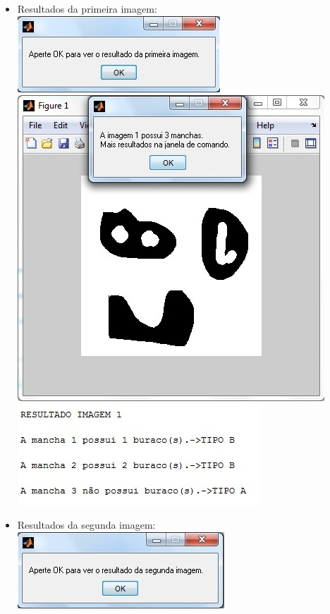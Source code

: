 \documentclass[conference]{IEEEtran}
\begin{document}
\begin{itemize}
	\item Resultados da primeira imagem:
		\vspace{2\baselineskip}\vspace{-\parskip}
		\includegraphics[scale=0.95]{images/janela1}
		\includegraphics[scale=0.65]{images/janela1-2}
		\includegraphics[scale=0.8]{images/comando1}
		\vspace{2\baselineskip}\vspace{-\parskip}
	\item Resultados da segunda imagem:
		\vspace{2\baselineskip}\vspace{-\parskip}
		\includegraphics[scale=0.95]{images/janela2}

\end{itemize}
\end{document}
